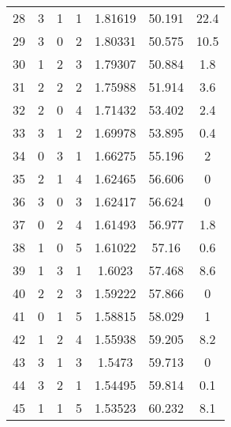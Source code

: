 \documentclass[11pt]{article}
\begin{document}
\begin{table}[htbp]
\begin{tabular}{ccccccc}
			28 & 3 & 1 & 1 & 1.81619 & 50.191 & 22.4 \\
			29 & 3 & 0 & 2 & 1.80331 & 50.575 & 10.5 \\
			30 & 1 & 2 & 3 & 1.79307 & 50.884 & 1.8 \\
			31 & 2 & 2 & 2 & 1.75988 & 51.914 & 3.6 \\
			32 & 2 & 0 & 4 & 1.71432 & 53.402 & 2.4 \\
			33 & 3 & 1 & 2 & 1.69978 & 53.895 & 0.4 \\
			34 & 0 & 3 & 1 & 1.66275 & 55.196 & 2 \\
			35 & 2 & 1 & 4 & 1.62465 & 56.606 & 0 \\
			36 & 3 & 0 & 3 & 1.62417 & 56.624 & 0 \\
			37 & 0 & 2 & 4 & 1.61493 & 56.977 & 1.8 \\
			38 & 1 & 0 & 5 & 1.61022 & 57.16 & 0.6 \\
			39 & 1 & 3 & 1 & 1.6023 & 57.468 & 8.6 \\
			40 & 2 & 2 & 3 & 1.59222 & 57.866 & 0 \\
			41 & 0 & 1 & 5 & 1.58815 & 58.029 & 1 \\
			42 & 1 & 2 & 4 & 1.55938 & 59.205 & 8.2 \\
			43 & 3 & 1 & 3 & 1.5473 & 59.713 & 0 \\
			44 & 3 & 2 & 1 & 1.54495 & 59.814 & 0.1 \\
			45 & 1 & 1 & 5 & 1.53523 & 60.232 & 8.1 \\
			
			\bottomrule
		\end{tabular}%
		\label{tab:SrCO3_Peaks_1}%
	\end{table}%
	
\end{document}
